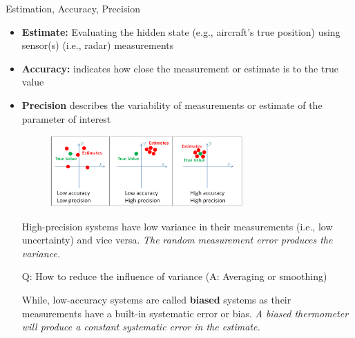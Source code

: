 \begin{frame}{Estimation, Accuracy, Precision}
        \begin{itemize}
            \item \textbf{Estimate:} Evaluating the hidden state (e.g., aircraft's true position) using sensor(s) (i.e., radar) measurements
            \item \textbf{Accuracy:} indicates how close the measurement or estimate is to the true value
            \item \textbf{Precision} describes the variability of measurements or estimate of the parameter of interest
            
            \begin{figure}
		       \centering
		        \includegraphics[width=0.7\textwidth]{Figures/Chapter1/AccuracyAndPrecision.png}
		        \label{fig:AccuracyAndPrecision}
	        \end{figure}
	        High-precision systems have low variance in their measurements (i.e., low uncertainty) and vice versa. \textit{The random measurement error produces the variance.}
	        
	        Q: How to reduce the influence of variance (A: Averaging or smoothing)
	        
	        \vspace{5pt}
	        While, low-accuracy systems are called \textbf{biased} systems as their measurements have a built-in systematic error or bias. \textit{A biased thermometer will produce a constant systematic error in the estimate.}
	        
	        
        \end{itemize} 
\end{frame}


